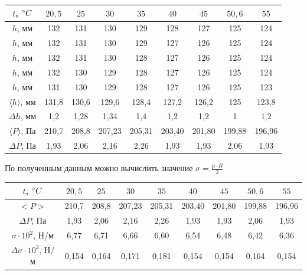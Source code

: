 \documentclass[a4paper, 12pt]{article} %
\begin{document}
\begin{center}
\begin{tabular}{|c|c|c|c|c|c|c|c|c|}
\hline
    $t$, $\degree C$ & $20,5$ & $25$ & $30$ & $35$ & $40$ & $45$ & $50,6$ & $55$ 	\\
    \hline
    $h$, мм & 132 & 131 & 130 & 129 & 128 & 127 & 125 & 124\\
    \hline
    $h$, мм & 132 & 131 & 130 & 129 & 127 & 126 & 125 & 124\\
    \hline
    $h$, мм & 132 & 131 & 130 & 128 & 127 & 126 & 125 & 124\\
    \hline
    $h$, мм & 132 & 130 & 129 & 128 & 127 & 126 & 125 & 124\\
    \hline
    $h$, мм & 131 & 130 & 129 & 128 & 127 & 126 & 125 & 123\\
    \hline
    $ \langle h \rangle$, мм & 131,8 & 130,6 & 129,6 & 128,4 & 127,2 & 126,2 & 125 & 123,8\\
    \hline
    $\Delta h $, мм & 1,2 & 1,28 & 1,34 & 1,4 & 1,2 & 1,2 & 1 & 1,2\\
    \hline
    $\langle P \rangle$, Па & 210,7 & 208,8 & 207,23 & 205,31 & 203,40 & 201,80 & 199,88 & 196,96 \\
    \hline
    $\Delta P$, Па & 1,93 & 2,06 & 2,16 & 2,26 & 1,93 & 1,93 & 2,06 & 1,93 \\
    \hline
\end{tabular}
\end{center}

По полученным данным можно вычислить значение $\sigma = \frac{p \cdot R}{2}$

\begin{center}
\begin{tabular}{|c|c|c|c|c|c|c|c|c|}
\hline
    $t$, $\degree C$ & $20,5$ & $25$ & $30$ & $35$ & $40$ & $45$ & $50,6$ & $55$ 	\\
    \hline
    $<P>$ & 210,7 & 208,8 & 207,23 & 205,31 & 203,40 & 201,80 & 199,88 & 196,96 \\
    \hline
    $\Delta P$, Па & 1,93 & 2,06 & 2,16 & 2,26 & 1,93 & 1,93 & 2,06 & 1,93 \\
    \hline
    $\sigma \cdot 10^2$, Н/м & 6,77 & 6,71 & 6,66 & 6,60 & 6,54 & 6,48 & 6,42 & 6,36 \\
    \hline
    $\Delta \sigma \cdot 10^2$, Н/м & 0,154 & 0,164 & 0,171 & 0,181 & 0,154 & 0,154 & 0,164 & 0,154 \\
    \hline
\end{tabular}
\end{center}
\end{document}
